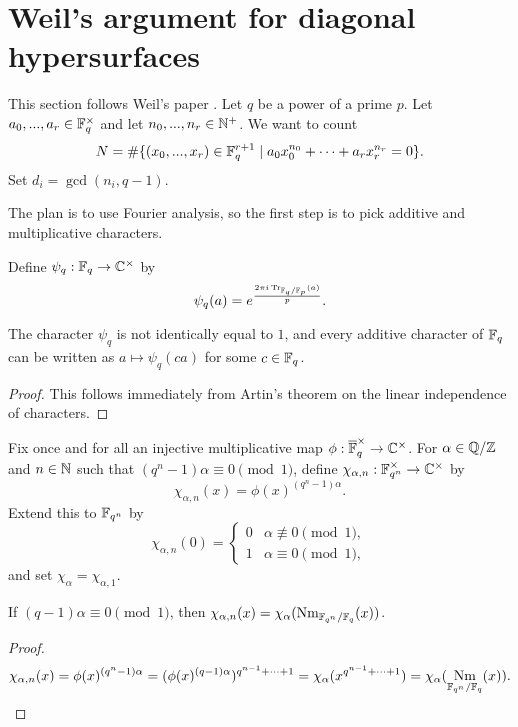 \documentclass[letterpaper,11pt]{article}
\DeclareMathOperator{\Nm}{Nm}
\DeclareMathOperator{\Tr}{Tr}
\begin{document}
\section{Weil's argument for diagonal hypersurfaces}

This section follows Weil's paper \cite{weil}. Let $q$ be a power of a prime $p$. Let $a_0, ..., a_r \in \mathbb{F}_q^\times$ and let $n_0, ..., n_r \in \mathbb{N}^+$. We want to count
\[
N = \#\{(x_0, ..., x_r)\in \mathbb{F}_q^{r+1} \mid a_0x_0^{n_0} + \cdots + a_rx_r^{n_r} = 0\}.
\]
Set $d_i = \gcd(n_i,q-1)$.

The plan is to use Fourier analysis, so the first step is to pick additive and multiplicative characters.

\begin{defn} Define $\psi_q:\mathbb{F}_q \rightarrow \mathbb{C}^\times$ by
\[
\psi_q(a) = e^{\frac{2\pi i\Tr_{\FF_q/\FF_p}(a)}{p}}.
\]
\end{defn}

\begin{prop} The character $\psi_q$ is not identically equal to $1$, and every additive character of $\mathbb{F}_q$ can be written as $a \mapsto \psi_q(ca)$ for some $c \in \mathbb{F}_q$.
\end{prop}
\begin{proof} This follows immediately from Artin's theorem on the linear independence of characters.
\end{proof}

\begin{defn} Fix once and for all an injective multiplicative map $\phi:\overline{\mathbb{F}}_q^\times \rightarrow \mathbb{C}^\times$. For $\alpha \in \mathbb{Q}/\mathbb{Z}$ and $n \in \mathbb{N}$ such that $(q^n-1)\alpha \equiv 0 \pmod{1}$, define $\chi_{\alpha,n} : \mathbb{F}_{q^n}^\times \rightarrow \mathbb{C}^\times$ by
\[
\chi_{\alpha,n}(x) = \phi(x)^{(q^n-1)\alpha}.
\]
Extend this to $\mathbb{F}_{q^n}$ by
\[
\chi_{\alpha,n}(0) = \begin{cases}0 & \alpha \not\equiv 0 \pmod{1},\\ 1 & \alpha \equiv 0 \pmod{1},\end{cases}
\]
and set $\chi_{\alpha} = \chi_{\alpha,1}$.
\end{defn}

\begin{prop} If $(q-1)\alpha \equiv 0 \pmod{1}$, then $\chi_{\alpha,n}(x) = \chi_{\alpha}(\Nm_{\FF_{q^n}/\FF_q}(x))$.
\end{prop}
\begin{proof}
\[
\chi_{\alpha,n}(x) = \phi(x)^{(q^n-1)\alpha} = (\phi(x)^{(q-1)\alpha})^{q^{n-1}+\cdots+1} = \chi_\alpha(x^{q^{n-1}+\cdots+1}) = \chi_\alpha(\Nm_{\FF_{q^n}/\FF_q}(x)).\qedhere
\]
\end{proof}
\end{document}
